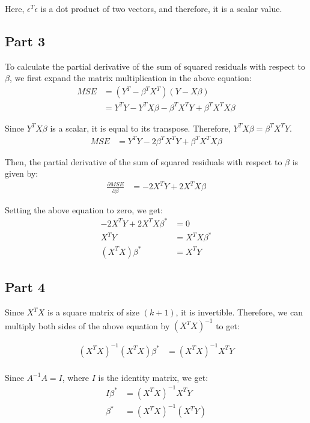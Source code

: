 \documentclass{article}[12pt]
\begin{document}
Here, $\epsilon^T \epsilon$ is a dot product of two vectors, and therefore, it is a scalar value.

\subsection{Part 3}

To calculate the partial derivative of the sum of squared residuals with respect to $\beta$,
we first expand the matrix multiplication in the above equation:
\begin{align*}
    MSE & = (Y^T - \beta^T X^T) (Y - X \beta)                         \\
        & = Y^T Y - Y^T X \beta - \beta^T X^T Y + \beta^T X^T X \beta
\end{align*}

Since $Y^T X \beta$ is a scalar, it is equal to its transpose. Therefore, $Y^T X \beta = \beta^T X^T Y$.
\begin{align*}
    MSE & = Y^T Y - 2 \beta^T X^T Y + \beta^T X^T X \beta
\end{align*}

Then, the partial derivative of the sum of squared residuals with respect to $\beta$ is given by:
\begin{align*}
    \frac{\partial MSE}{\partial \beta} & = -2 X^T Y + 2 X^T X \beta
\end{align*}

Setting the above equation to zero, we get:
\begin{align*}
    -2 X^T Y + 2 X^T X \beta^* & = 0             \\
    X^T Y                      & = X^T X \beta^* \\
    (X^T X) \beta^*            & = X^T Y
\end{align*}

\subsection{Part 4}
Since $X^T X$ is a square matrix of size $(k+1)$, it is invertible.
Therefore, we can multiply both sides of the above equation by $(X^T X)^{-1}$ to get:

\begin{align*}
    (X^T X)^{-1} (X^T X) \beta^* & = (X^T X)^{-1} X^T Y \\
\end{align*}

Since $A^{-1} A = I$, where $I$ is the identity matrix, we get:
\begin{align*}
    I \beta^* & = (X^T X)^{-1} X^T Y   \\
    \beta^*   & = (X^T X)^{-1} (X^T Y)
\end{align*}
\end{document}
